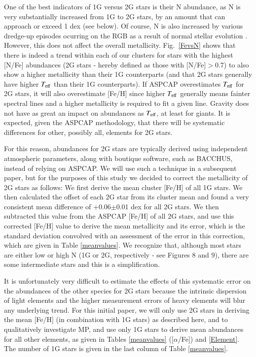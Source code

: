 \documentclass[onecolumn]{aa}
\begin{document}
One of the best indicators of 1G versus 2G stars is their N abundance, as N is very substantially
increased from 1G to 2G stars, by an amount that can approach or exceed 1 dex (see below).
Of course, N is also increased by various dredge-up episodes ocurring on the RGB
as a result of normal stellar evolution \citep{Kraft1994, Gratton2000}. However, this does not affect the overall metallicity. 
Fig.~\ref{FevsN} shows that there is indeed a trend within each of our clusters for stars with the highest [N/Fe] abundances (2G stars - hereby defined as those with [N/Fe]$>$0.7) to also show a higher metallicity than their 1G counterparts (and that 2G stars generally have higher $T_{\rm eff}$ than their 1G counterparts). If ASPCAP overestimates $T_{\rm eff}$ for 2G stars, it will also overestimate [Fe/H] since higher $T_{\rm eff}$ generally means fainter spectral lines and a higher metallicity is required to fit a given line. Gravity does not have as great an impact on abundances as $T_{\rm eff}$, at least for giants. It
is expected, given the ASPCAP methodology, that there will be systematic differences for other, possibly all, elements for 2G stars.

For this reason, abundances for 2G stars are typically derived using independent atmospheric parameters,
along with boutique software, such as BACCHUS,
instead of relying on ASPCAP. We will use such a technique in a subsequent paper, but for the purposes of this study we decided to correct the metallicity of 2G stars as follows: We first derive the mean cluster [Fe/H] of all 1G stars. We then calculated the offset of each 2G star from its cluster mean and found a very consistent mean difference of +0.06$\pm$0.01 dex for all 2G stars. We then subtracted this value from the ASPCAP [Fe/H] of all 2G stars, and use this corrected [Fe/H] value to derive the mean metallicity {and its error, which is
the standard deviation convolved with an assessment of the error in this correction}, which are given in Table \ref{meanvalues}. We recognize that, although most stars are either low or high N (1G or 2G, respectively - see Figures 8 and 9), there are some intermediate stars and this is a simplification.  

It is unfortunately very difficult to estimate the effects of this systematic error on the abundances of the other species for 2G stars because the intrinsic dispersion of light elements and the higher measurement errors of heavy elements will blur any underlying trend. 
For this initial paper, we will only use 2G stars in deriving the mean [Fe/H] (in combination with 1G stars) as described here,  and to qualitatively investigate MP, and use only 1G stars to derive mean abundances for all other elements, as given in Tables \ref{meanvalues} ([$\alpha$/Fe]) and \ref{Element}. The number of 1G stars is given in the last column of Table \ref{meanvalues}.
\end{document}
